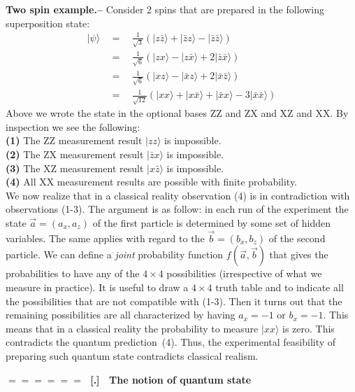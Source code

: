 \documentclass[onecolumn,fleqn]{revtex4}
\newcommand{\beq}{\begin{eqnarray}}
\newcommand{\eeq}{\end{eqnarray}}
\renewcommand{\thesubsection}{\arabic{subsection}}
\renewcommand{\thesubsubsection}{\arabic{subsubsection}}
\newcommand{\sheadC}[1]
{
\addtocounter{subsubsection}{1}
\vspace{5mm}
{\Large\bf $=\!=\!=\!=\!=\!=\;$ [\thesubsection.\thesubsubsection] \ #1}  
\nopagebreak
\phantomsection
}
\begin{document}
{\bf Two spin example.-- }
Consider 2 spins that are prepared in the following superposition state: 
\beq
|\psi\rangle 
\ \ &=& \ \ \frac{1}{\sqrt{3}}\left(| z\bar{z} \rangle + | \bar{z}z \rangle - | \bar{z}\bar{z} \rangle  \right) \\
\ \ &=& \ \ \frac{1}{\sqrt{6}}\left(| zx \rangle - | z\bar{x} \rangle + 2 | \bar{z}\bar{x} \rangle  \right) \\
\ \ &=& \ \ \frac{1}{\sqrt{6}}\left(| xz \rangle - | \bar{x}z \rangle + 2 | \bar{x}\bar{z} \rangle  \right) \\
\ \ &=& \ \ \frac{1}{\sqrt{12}}\left(| xx \rangle + | x\bar{x} \rangle +  | \bar{x}x \rangle - 3 | \bar{x}\bar{x} \rangle \right)
\eeq
Above we wrote the state in the optional bases ZZ and ZX and XZ and XX.
By inspection we see the following: \\
{\bf \hspace*{5mm} (1)} The ZZ measurement result $| zz \rangle$ is impossible. \\
{\bf \hspace*{5mm} (2)} The ZX measurement result $| \bar{z}x \rangle$ is impossible. \\
{\bf \hspace*{5mm} (3)} The XZ measurement result $| x\bar{z} \rangle$ is impossible. \\
{\bf \hspace*{5mm} (4)} All XX measurement results are possible with finite probability. \\
We now realize that in a classical reality observation (4) is in contradiction 
with observations (1-3). The argument is as follow: in each run of the experiment 
the state ${\vec{a}=(a_x,a_z)}$ of the first particle is determined by some set of hidden variables. 
The same applies with regard to the ${\vec{b}=(b_x,b_z)}$ of the second particle. 
We can define a {\em joint} probability function $f\left(\vec{a},\vec{b}\right)$ that gives the 
probabilities to have any of the $4\times4$ possibilities (irrespective 
of what we measure in practice). 
It is useful to draw a $4\times4$ truth table and to indicate all 
the possibilities that are not compatible with (1-3). Then it turns out 
that the remaining possibilities are all characterized by 
having ${a_x=-1}$ or  ${b_x=-1}$. This means that in a classical
reality the probability to measure $| xx \rangle$ is zero.
This contradicts the quantum prediction~(4). Thus, the experimental feasibility 
of preparing such quantum state contradicts classical realism.


\sheadC{The notion of quantum state}
\end{document}
